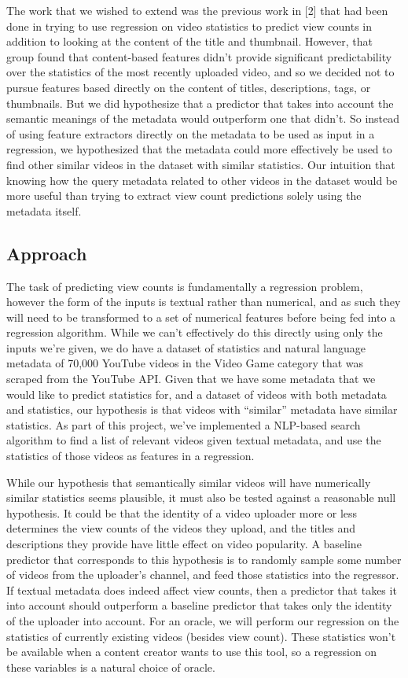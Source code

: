 \documentclass[12pt]{article}
\theoremstyle{definition}
\theoremstyle{remark}
\begin{document}
The work that we wished to extend was the previous work in [2] that had been done in
trying to use regression on video statistics to predict view counts in addition
to looking at the content of the title and thumbnail. However, that group found
that content-based features didn't provide significant predictability over the
statistics of the most recently uploaded video, and so we decided not to pursue
features based directly on the content of titles, descriptions, tags, or
thumbnails. But we did hypothesize that a predictor that takes into account the
semantic meanings of the metadata would outperform one that didn't. So instead
of using feature extractors directly on the metadata to be used as input in a
regression, we hypothesized that the metadata could more effectively be used to
find other similar videos in the dataset with similar statistics. Our intuition
that knowing how the query metadata related to other videos in the dataset would
be more useful than trying to extract view count predictions solely using the
metadata itself.


\subsection{Approach}
The task of predicting view counts is fundamentally a regression problem,
however the form of the inputs is textual rather than numerical, and as such
they will need to be transformed to a set of numerical features before being fed
into a regression algorithm. While we can't effectively do this directly using
only the inputs we're given, we do have a dataset of statistics and natural
language metadata of 70,000 YouTube videos in the Video Game category that was
scraped from the YouTube API. Given
that we have some metadata that we would like to predict statistics for, and a
dataset of videos with both metadata and statistics, our hypothesis is that
videos with ``similar'' metadata have similar statistics. As part of this
project, we've implemented a NLP-based search algorithm to find a list of
relevant videos given textual metadata, and use the statistics of those videos
as features in a regression.

While our hypothesis that semantically similar videos will have numerically
similar statistics seems plausible, it must also be tested against a reasonable
null hypothesis. It could be that the identity of a video uploader more or less
determines the view counts of the videos they upload, and the titles and
descriptions they provide have little effect on video popularity. A baseline
predictor that corresponds to this hypothesis is to randomly sample some number
of videos from the uploader's channel, and feed those statistics into the
regressor. If textual metadata does indeed affect view counts, then a predictor
that takes it into account should outperform a baseline predictor that takes
only the identity of the uploader into account. For an oracle, we will perform
our regression on the statistics of currently existing videos (besides view
count). These statistics won't be available when a content creator wants to use
this tool, so a regression on these variables is a natural choice of oracle.
\end{document}
